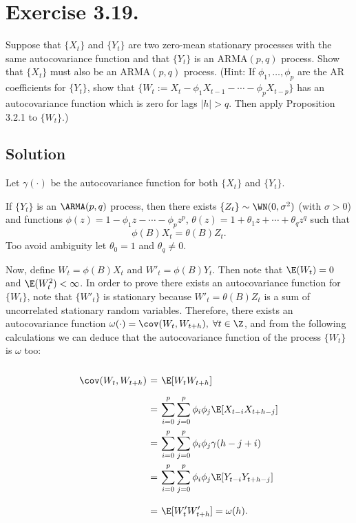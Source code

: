 \section*{Exercise 3.19.}

Suppose that $\{X_t\}$ and $\{Y_t\}$ are two zero-mean stationary processes with the same autocovariance function and that $\{Y_t\}$ is an ARMA$(p, q)$ process. Show that $\{X_t\}$ must also be an ARMA$(p, q)$ process. (Hint: If $\phi_1, \dots, \phi_p$ are the AR coefficients for $\{Y_t\}$, show that $\{W_t := X_t - \phi_1 X_{t-1} - \cdots - \phi_p X_{t-p}\}$ has an autocovariance function which is zero for lags $|h| > q$. Then apply Proposition 3.2.1 to $\{W_t\}$.)

\subsection*{Solution}

Let $\gamma(\cdot)$ be the autocovariance function for both $\{X_t\}$ and $\{Y_t\}$.

If $\{Y_t\}$ is an $\ARMA(p,q)$ process, then there exists $\{Z_t\} \sim \WN(0,\sigma^2)$ (with $\sigma > 0$) and functions $\phi(z) = 1-\phi_1z -\cdots-\phi_p z^p$, $\theta(z) = 1 + \theta_1 z + \cdots + \theta_q z^q$ such that
\[ \phi(B) X_t = \theta(B) Z_t. \]
Too avoid ambiguity let $\theta_0 = 1$ and $\theta_q \neq 0$.

Now, define $W_t = \phi(B) X_t$ and $W'_t = \phi(B) Y_t$. Then note that $\E(W_t) = 0$ and $\E(W_t^2) < \infty$. In order to prove there exists an autocovariance function for $\{W_t\}$, note that $\{W'_t\}$ is stationary because $W'_t = \theta(B) Z_t$ is a sum of uncorrelated stationary random variables. Therefore, there exists an autocovariance function $\omega(\cdot) = \cov(W_t,W_{t+h}),\; \forall t \in \Z$, and from the following calculations we can deduce that the autocovariance function of the process $\{W_t\}$ is $\omega$ too:
\[ \everymath{\displaystyle}
\arraycolsep=1.8pt\def\arraystretch{2.5}
\begin{array}{rcl}
    \cov(W_t,W_{t+h}) & = & \E[W_t W_{t+h}]\\
    & = & \sum_{i = 0}^{p}\sum_{j = 0}^{p} \phi_i \phi_j \E[X_{t-i} X_{t+h-j}]\\
    & = & \sum_{i = 0}^{p}\sum_{j = 0}^{p} \phi_i \phi_j \gamma(h-j+i)\\
    & = & \sum_{i = 0}^{p}\sum_{j = 0}^{p} \phi_i \phi_j \E[Y_{t-i} Y_{t+h-j}]\\
    & = & \E[W'_t W'_{t+h}] = \omega(h).\\
\end{array} \]

